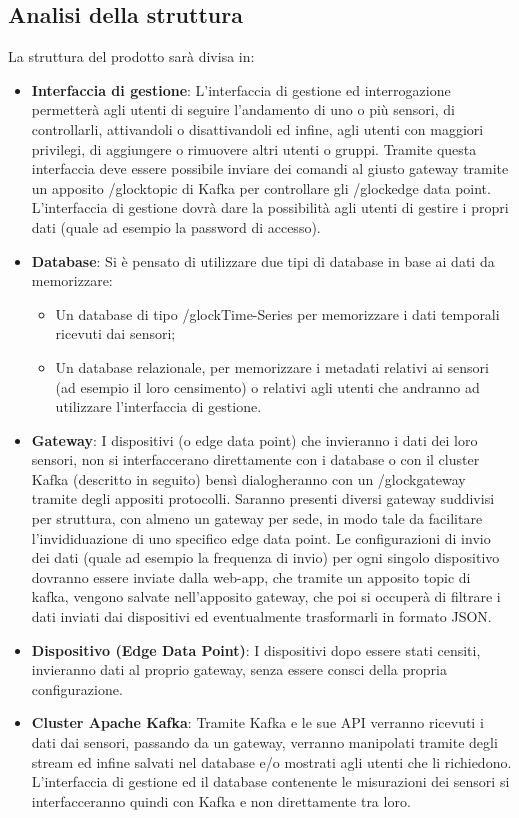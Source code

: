	\subsection{Analisi della struttura}
		La struttura del prodotto sarà divisa in:
		\begin{itemize}
			\item \textbf{Interfaccia di gestione}: L'interfaccia di gestione ed interrogazione permetterà agli utenti di seguire l'andamento di uno o più sensori, di controllarli, attivandoli o disattivandoli ed infine, agli utenti con maggiori privilegi, di aggiungere o rimuovere altri utenti o gruppi.
			Tramite questa interfaccia deve essere possibile inviare dei comandi al giusto gateway tramite un apposito /glock{topic} di Kafka per controllare gli /glock{edge data point}. 
			L'interfaccia di gestione dovrà dare la possibilità agli utenti di gestire i propri dati (quale ad esempio la password di accesso).
			\item \textbf{Database}: Si è pensato di utilizzare due tipi di database in base ai dati da memorizzare:
			\begin{itemize}
				\item Un database di tipo /glock{Time-Series} per memorizzare i dati temporali ricevuti dai sensori;
				\item Un database relazionale, per memorizzare i metadati relativi ai sensori (ad esempio il loro censimento) o relativi agli utenti che andranno ad utilizzare l'interfaccia di gestione.
			\end{itemize}

			\item \textbf{Gateway}: I dispositivi (o edge data point) che invieranno i dati dei loro sensori, non si interfaccerano direttamente con i database o con il cluster Kafka (descritto in seguito) bensì dialogheranno con un /glock{gateway} tramite degli appositi protocolli.
			Saranno presenti diversi gateway suddivisi per struttura, con almeno un gateway per sede, in modo tale da facilitare l'invididuazione di uno specifico edge data point.
			Le configurazioni di invio dei dati (quale ad esempio la frequenza di invio) per ogni singolo dispositivo dovranno essere inviate dalla web-app, che tramite un apposito topic di kafka, vengono salvate nell'apposito gateway, che poi si occuperà di filtrare i dati inviati dai dispositivi ed eventualmente trasformarli in formato JSON. 

			\item \textbf{Dispositivo (Edge Data Point)}: I dispositivi dopo essere stati censiti, invieranno dati al proprio gateway, senza essere consci della propria configurazione.

			\item \textbf{Cluster Apache Kafka}: Tramite Kafka e le sue API verranno ricevuti i dati dai sensori, passando da un gateway, verranno manipolati tramite degli stream ed infine salvati nel database e/o mostrati agli utenti che li richiedono. L'interfaccia di gestione ed il database contenente le misurazioni dei sensori si interfacceranno quindi con Kafka e non direttamente tra loro.

		\end{itemize}
